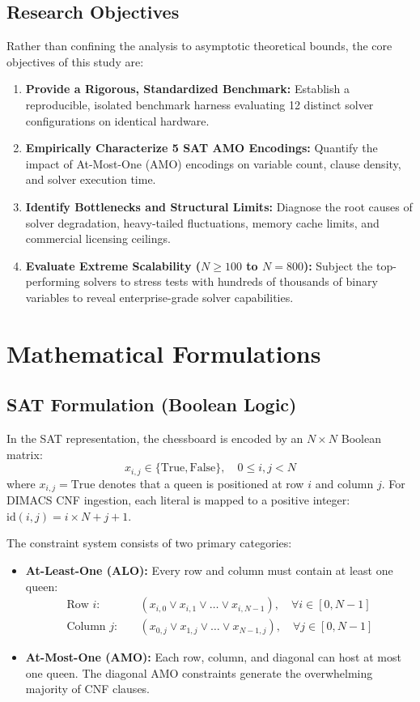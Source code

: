 \documentclass[a4paper,11pt]{article}
\begin{document}
\subsection{Research Objectives}
Rather than confining the analysis to asymptotic theoretical bounds, the core objectives of this study are:
\begin{enumerate}
    \item \textbf{Provide a Rigorous, Standardized Benchmark:} Establish a reproducible, isolated benchmark harness evaluating 12 distinct solver configurations on identical hardware.
    \item \textbf{Empirically Characterize 5 SAT AMO Encodings:} Quantify the impact of At-Most-One (AMO) encodings on variable count, clause density, and solver execution time.
    \item \textbf{Identify Bottlenecks and Structural Limits:} Diagnose the root causes of solver degradation, heavy-tailed fluctuations, memory cache limits, and commercial licensing ceilings.
    \item \textbf{Evaluate Extreme Scalability ($N \ge 100$ to $N=800$):} Subject the top-performing solvers to stress tests with hundreds of thousands of binary variables to reveal enterprise-grade solver capabilities.
\end{enumerate}

\section{Mathematical Formulations}

\subsection{SAT Formulation (Boolean Logic)}
In the SAT representation, the chessboard is encoded by an $N \times N$ Boolean matrix:
\begin{equation}
    x_{i,j} \in \{\text{True}, \text{False}\}, \quad 0 \le i, j < N
\end{equation}
where $x_{i,j} = \text{True}$ denotes that a queen is positioned at row $i$ and column $j$. For DIMACS CNF ingestion, each literal is mapped to a positive integer: $\text{id}(i, j) = i \times N + j + 1$.

The constraint system consists of two primary categories:
\begin{itemize}
    \item \textbf{At-Least-One (ALO):} Every row and column must contain at least one queen:
    \begin{align}
        \text{Row } i: & \quad (x_{i,0} \lor x_{i,1} \lor \dots \lor x_{i,N-1}), \quad \forall i \in [0, N-1] \\
        \text{Column } j: & \quad (x_{0,j} \lor x_{1,j} \lor \dots \lor x_{N-1,j}), \quad \forall j \in [0, N-1]
    \end{align}
    \item \textbf{At-Most-One (AMO):} Each row, column, and diagonal can host at most one queen. The diagonal AMO constraints generate the overwhelming majority of CNF clauses.
\end{itemize}
\end{document}
